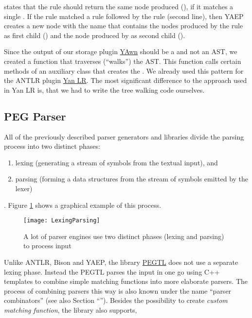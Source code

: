 states that the rule  should return the same node  produced (), if it matches a single . If the rule  matched a rule  followed by the rule  (second line), then YAEP creates a new node with the name  that contains the nodes produced by the rule  as first child () and the node produced by  as second child ().

Since the output of our storage plugin \href{https://www.libelektra.org/plugins/yawn}{YAwn} should be a  and not an \gls{AST}, we created a function that traverses (“walks”) the \gls{AST}. This function calls certain methods of an auxiliary class  that creates the . We already used this pattern for the ANTLR plugin \href{https://www.libelektra.org/plugins/yanlr}{Yan LR}. The most significant difference to the approach used in Yan LR is, that we had to write the tree walking code ourselves.

\subsection{PEG Parser}
\label{sec:peg_parser}

All of the previously described parser generators and libraries divide the parsing process into two distinct phases:

\begin{enumerate}
  \item lexing (generating a stream of symbols from the textual input), and
  \item parsing (forming a data structures from the stream of symbols emitted by the lexer)
\end{enumerate}

. Figure \ref{fig:lexing_parsing} shows a graphical example of this process.

\begin{figure}
  \centering
    \texttt{[image: LexingParsing]}
  \caption{A lot of parser engines use two distinct phases (lexing and parsing) to process input}
  \label{fig:lexing_parsing}
\end{figure}

Unlike ANTLR, Bison and YAEP, the library \href{https://github.com/taocpp/PEGTL}{PEGTL} does not use a separate lexing phase. Instead the \gls{PEGTL} parses the input in one go using C++ templates to combine simple matching functions into more elaborate parsers. The process of combining parsers this way is also known under the name “parser combinators” (see also Section “”). Besides the possibility to create \emph{custom matching function}, the library also supports,

